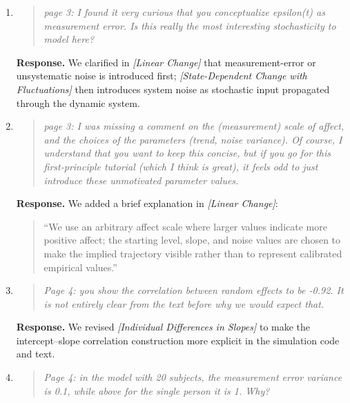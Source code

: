 \documentclass[11pt]{article}
\newcommand{\response}{\textbf{Response.} }
\newcommand{\secit}[1]{\textit{[#1]}}
\newcommand{\msq}[1]{\begin{quote}\small\noindent``#1''\end{quote}}
\newenvironment{reviewerpoint}{\begin{quote}\itshape}{\end{quote}}
\begin{document}
\begin{enumerate}[label=\textbf{Reviewer 1, Minor Point \arabic*.}]
\response We revised the opening of \secit{Linear Change} so the first example is framed as a minimally dynamic linear-change model rather than the simplest conceivable case.
\item

\begin{reviewerpoint}
page 3: I found it very curious that you conceptualize epsilon(t) as measurement error.
Is this really the most interesting stochasticity to model here?
\end{reviewerpoint}

\response We clarified in \secit{Linear Change} that measurement-error or unsystematic noise is introduced first; \secit{State-Dependent Change with Fluctuations} then introduces system noise as stochastic input propagated through the dynamic system.
\item

\begin{reviewerpoint}
page 3: I was missing a comment on the (measurement) scale of affect, and the choices of the parameters (trend, noise variance).
Of course, I understand that you want to keep this concise, but if you go for this first-principle tutorial (which I think is great), it feels odd to just introduce these unmotivated parameter values.
\end{reviewerpoint}

\response We added a brief explanation in \secit{Linear Change}:
\msq{We use an arbitrary affect scale where larger values indicate more positive affect; the starting level, slope, and noise values are chosen to make the implied trajectory visible rather than to represent calibrated empirical values.}
\item

\begin{reviewerpoint}
Page 4: you show the correlation between random effects to be -0.92.
It is not entirely clear from the text before why we would expect that.
\end{reviewerpoint}

\response We revised \secit{Individual Differences in Slopes} to make the intercept--slope correlation construction more explicit in the simulation code and text.
\item

\begin{reviewerpoint}
Page 4: in the model with 20 subjects, the measurement error variance is 0.1, while above for the single person it is 1.
Why?
\end{reviewerpoint}


\end{enumerate}
\end{document}
